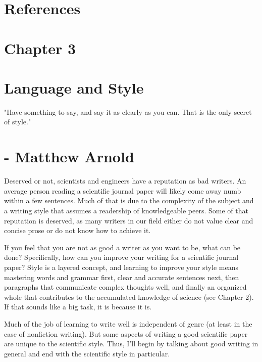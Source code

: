 \section*{References}
\section*{Chapter 3}
\section*{Language and Style}
"Have something to say, and say it as clearly as you can. That is the only secret of style."

\section*{- Matthew Arnold}
Deserved or not, scientists and engineers have a reputation as bad writers. An average person reading a scientific journal paper will likely come away numb within a few sentences. Much of that is due to the complexity of the subject and a writing style that assumes a readership of knowledgeable peers. Some of that reputation is deserved, as many writers in our field either do not value clear and concise prose or do not know how to achieve it.

If you feel that you are not as good a writer as you want to be, what can be done? Specifically, how can you improve your writing for a scientific journal paper? Style is a layered concept, and learning to improve your style means mastering words and grammar first, clear and accurate sentences next, then paragraphs that communicate complex thoughts well, and finally an organized whole that contributes to the accumulated knowledge of science (see Chapter 2). If that sounds like a big task, it is because it is.

Much of the job of learning to write well is independent of genre (at least in the case of nonfiction writing). But some aspects of writing a good scientific paper are unique to the scientific style. Thus, I'll begin by talking about good writing in general and end with the scientific style in particular.

